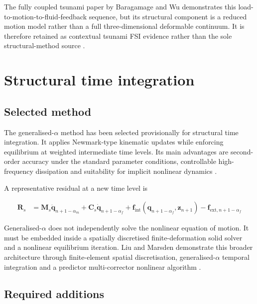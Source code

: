 \documentclass[11pt,a4paper]{article}
\begin{document}
The fully coupled tsunami paper by Baragamage and Wu demonstrates this load-to-motion-to-fluid-feedback sequence, but its structural component is a reduced motion model rather than a full three-dimensional deformable continuum. It is therefore retained as contextual tsunami FSI evidence rather than the sole structural-method source \autocite{baragamage2024}.

\section{Structural time integration}
\label{sec:time-integration}

\subsection{Selected method}
\label{subsec:selected-time-method}

The generalised-\(\alpha\) method has been selected provisionally for structural time integration. It applies Newmark-type kinematic updates while enforcing equilibrium at weighted intermediate time levels. Its main advantages are second-order accuracy under the standard parameter conditions, controllable high-frequency dissipation and suitability for implicit nonlinear dynamics \autocite{chung1993,liu2018}.

A representative residual at a new time level is

\begin{align}
\bm{R}_{s}
&=
\bm{M}_{s}\ddot{\bm{q}}_{n+1-\alpha_{m}}
+ \bm{C}_{s}\dot{\bm{q}}_{n+1-\alpha_{f}}
+ \bm{f}_{\mathrm{int}}\!\left(\bm{q}_{n+1-\alpha_{f}},\bm{z}_{n+1}\right)
- \bm{f}_{\mathrm{ext},n+1-\alpha_{f}}
\label{eq:generalized-alpha-residual}
\end{align}

Generalised-\(\alpha\) does not independently solve the nonlinear equation of motion. It must be embedded inside a spatially discretised finite-deformation solid solver and a nonlinear equilibrium iteration. Liu and Marsden demonstrate this broader architecture through finite-element spatial discretisation, generalised-\(\alpha\) temporal integration and a predictor multi-corrector nonlinear algorithm \autocite{liu2018}.

\subsection{Required additions}
\label{subsec:required-structural-additions}
\end{document}

